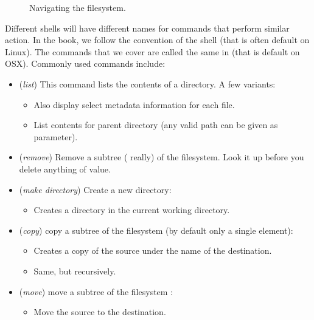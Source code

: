 \begin{figure}[tbp]
  
  \caption{Navigating the filesystem.}
  \label{fig:bg:processes:navigation}
\end{figure}

Different shells will have different names for commands that perform similar action. In the book, we follow the convention of the  shell (that is often default on Linux). The commands that we cover are called the same in  (that is default on OSX). Commonly used commands include:
\begin{itemize}
  \item {} (\textsl{list}) This command lists the contents of a directory. A few variants:
    \begin{itemize}
      \item {} Also display select metadata information for each file.
      \item {} List contents for parent directory (any valid path can be given as parameter).
    \end{itemize}
  \item {} (\textsl{remove}) Remove a subtree ( really) of the filesystem. Look it up before you delete anything of value.
  \item {} (\textsl{make directory}) Create a new directory:
    \begin{itemize}
      \item {} Creates a directory in the current working directory.
    \end{itemize}
  \item {} (\textsl{copy}) copy a subtree of the filesystem (by default only a single element):
    \begin{itemize}
      \item {} Creates a copy of the source under the name of the destination.
      \item {} Same, but recursively.
    \end{itemize}
  \item {} (\textsl{move}) move a subtree of the filesystem :
    \begin{itemize}
      \item {} Move the source to the destination.
    \end{itemize}
\end{itemize}


